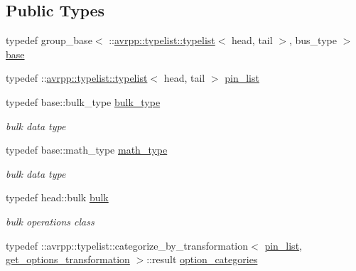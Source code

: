 \subsection*{Public Types}
\begin{DoxyCompactItemize}
\item 
typedef group\_\-base$<$ ::\hyperlink{structavrpp_1_1typelist_1_1typelist}{avrpp::typelist::typelist}$<$ head, tail $>$, bus\_\-type $>$ \hyperlink{structavrpp_1_1bus_1_1group__iobase_3_01_1_1avrpp_1_1typelist_1_1typelist_3_01head_00_01tail_01_4_00_01bus__type_01_4_a3c2a3f7afa6c666e7a625d027e9e89e0}{base}
\item 
typedef ::\hyperlink{structavrpp_1_1typelist_1_1typelist}{avrpp::typelist::typelist}$<$ head, tail $>$ \hyperlink{structavrpp_1_1bus_1_1group__iobase_3_01_1_1avrpp_1_1typelist_1_1typelist_3_01head_00_01tail_01_4_00_01bus__type_01_4_ac281364e1172dc238c204e44d0303397}{pin\_\-list}
\item 
typedef base::bulk\_\-type \hyperlink{structavrpp_1_1bus_1_1group__iobase_3_01_1_1avrpp_1_1typelist_1_1typelist_3_01head_00_01tail_01_4_00_01bus__type_01_4_ac5f551221d1d4e6bb1cb6b5ec9f564d5}{bulk\_\-type}
\begin{DoxyCompactList}\small\item\em bulk data type \item\end{DoxyCompactList}\item 
typedef base::math\_\-type \hyperlink{structavrpp_1_1bus_1_1group__iobase_3_01_1_1avrpp_1_1typelist_1_1typelist_3_01head_00_01tail_01_4_00_01bus__type_01_4_a143651b666f2d9a6e9f236b04b6dbb52}{math\_\-type}
\begin{DoxyCompactList}\small\item\em bulk data type \item\end{DoxyCompactList}\item 
typedef head::bulk \hyperlink{structavrpp_1_1bus_1_1group__iobase_3_01_1_1avrpp_1_1typelist_1_1typelist_3_01head_00_01tail_01_4_00_01bus__type_01_4_afef5ea0856142cfafc467b0c45a86505}{bulk}
\begin{DoxyCompactList}\small\item\em bulk operations class \item\end{DoxyCompactList}\item 
typedef ::avrpp::typelist::categorize\_\-by\_\-transformation$<$ \hyperlink{structavrpp_1_1typelist_1_1typelist}{pin\_\-list}, \hyperlink{structavrpp_1_1bus_1_1get__options__transformation}{get\_\-options\_\-transformation} $>$::result \hyperlink{structavrpp_1_1bus_1_1group__iobase_3_01_1_1avrpp_1_1typelist_1_1typelist_3_01head_00_01tail_01_4_00_01bus__type_01_4_a1aff854df5990b5d460cd2431a29527b}{option\_\-categories}

\end{DoxyCompactItemize}
